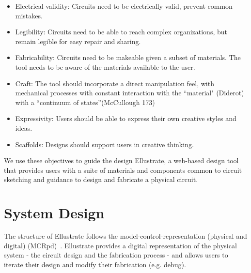 \documentclass{sigchi}
\begin{document}
    \begin{itemize}
        \item Electrical validity: Circuits need to be electrically valid, prevent common mistakes.
        \item Legibility: Circuits need to be able to reach complex organizations, but remain legible for easy repair and sharing. 
        \item Fabricability: Circuits need to be makeable given a subset of materials. The tool needs to be aware of the materials available to the user. 
        \item Craft: The tool should incorporate a direct manipulation feel, with mechanical processes with constant interaction with the ``material" (Diderot) with a  ``continuum of states''(McCullough 173)
        \item Expressivity: Users should be able to express their own creative styles and ideas. 
        \item Scaffolds: Designs should support users in creative thinking. 
    \end{itemize}
We use these objectives to guide the design Ellustrate, a web-based design tool that provides users with a suite of materials and components common to circuit sketching and guidance to design and fabricate a physical circuit.

\section{System Design}
The structure of Ellustrate follows the model-control-representation (physical and digital) (MCRpd)~\cite{ullmer2000emerging}. Ellustrate provides a digital representation of the physical system - the circuit design and the fabrication process - and allows users to iterate their design and modify their fabrication (e.g. debug). 
\end{document}
